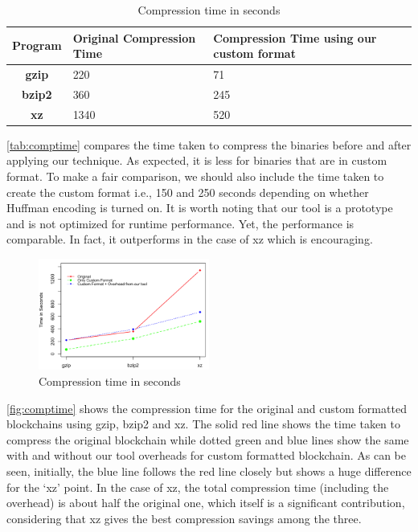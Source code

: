 \begin{table}[H]
	\centering
	\begin{tabular}{>{\bfseries}c | p{3cm} | p{3cm}} 
	Program & {Original Compression Time} & {Compression Time using our custom format} \\
	\hline
	gzip & 220  & 71 \\
	bzip2 & 360  & 245\\
	xz & 1340 & 520 \\
	\end{tabular}
	\caption{Compression time in seconds}
	\label{tab:comptime}
\end{table}
\autoref{tab:comptime} compares the time taken to compress the binaries before and after applying our technique. As expected, it is less for binaries that are in custom format. 
To make a fair comparison, we should also include the time taken to create the custom format i.e., 150 and 250 seconds depending on whether Huffman encoding is turned on.
It is worth noting that our tool is a prototype and is not optimized for runtime performance. 
Yet, the performance is comparable. 
In fact, it outperforms in the case of xz which is encouraging.
\begin{figure}[H]
	\centering
	\includegraphics[width=0.5\textwidth, scale=0.5]{plots/time}
	\caption{Compression time in seconds}
	\label{fig:comptime}
\end{figure}
\autoref{fig:comptime} shows the compression time for the original and custom formatted blockchains using gzip, bzip2 and xz.
The solid red line shows the time taken to compress the original blockchain while 
dotted green and blue lines show the same with and without our tool
overheads for custom formatted blockchain. 
As can be seen, initially, the blue line follows the red line closely
but shows a huge difference for the `xz' point.
In the case of xz, the total compression time (including the overhead) is about half the original one, which itself is a significant contribution, considering that xz gives the best compression savings among the three.

